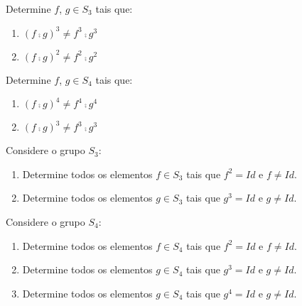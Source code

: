 \documentclass[12pt]{exam}
\begin{document}
\questao{} Determine $f$, $g \in S_3$ tais que:
\begin{enumerate}[label=({\alph*})]
	\item $(f \comp g)^3 \ne f^3\comp g^3$
	\item $(f \comp g)^2 \ne f^2\comp g^2$
\end{enumerate}

\vspace{.3cm}

\questao{} Determine $f$, $g \in S_4$ tais que:
\begin{enumerate}[label=({\alph*})]
	\item $(f \comp g)^4 \ne f^4\comp g^4$
	\item $(f \comp g)^3 \ne f^3\comp g^3$
\end{enumerate}

\vspace{.3cm}

\questao{} Considere o grupo $S_3$:
\begin{enumerate}[label=({\alph*})]
	\item Determine todos os elementos $f \in S_3$ tais que $f^2 = Id$ e $f \ne Id$.
	\item Determine todos os elementos $g \in S_3$ tais que $g^3 = Id$ e $g \ne Id$.
\end{enumerate}

\vspace{.3cm}

\questao{} Considere o grupo $S_4$:
\begin{enumerate}[label=({\alph*})]
	\item Determine todos os elementos $f \in S_4$ tais que $f^2 = Id$ e $f \ne Id$.
	\item Determine todos os elementos $g \in S_4$ tais que $g^3 = Id$ e $g \ne Id$.
	\item Determine todos os elementos $g \in S_4$ tais que $g^4 = Id$ e $g \ne Id$.
\end{enumerate}

\vspace{.3cm}
\end{document}
